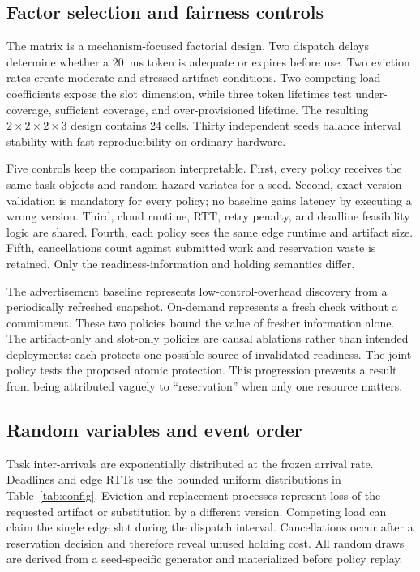 \documentclass[conference]{IEEEtran}
\begin{document}
\subsection{Factor selection and fairness controls}

The matrix is a mechanism-focused factorial design. Two dispatch delays determine
whether a 20~ms token is adequate or expires before use. Two eviction rates create
moderate and stressed artifact conditions. Two competing-load coefficients expose
the slot dimension, while three token lifetimes test under-coverage, sufficient
coverage, and over-provisioned lifetime. The resulting $2\times2\times2\times3$
design contains 24 cells. Thirty independent seeds balance interval stability with
fast reproducibility on ordinary hardware.

Five controls keep the comparison interpretable. First, every policy receives the
same task objects and random hazard variates for a seed. Second, exact-version
validation is mandatory for every policy; no baseline gains latency by executing a
wrong version. Third, cloud runtime, RTT, retry penalty, and deadline feasibility
logic are shared. Fourth, each policy sees the same edge runtime and artifact size.
Fifth, cancellations count against submitted work and reservation waste is retained.
Only the readiness-information and holding semantics differ.

The advertisement baseline represents low-control-overhead discovery from a
periodically refreshed snapshot. On-demand represents a fresh check without a
commitment. These two policies bound the value of fresher information alone. The
artifact-only and slot-only policies are causal ablations rather than intended
deployments: each protects one possible source of invalidated readiness. The joint
policy tests the proposed atomic protection. This progression prevents a result
from being attributed vaguely to ``reservation'' when only one resource matters.

\subsection{Random variables and event order}

Task inter-arrivals are exponentially distributed at the frozen arrival rate.
Deadlines and edge RTTs use the bounded uniform distributions in
Table~\ref{tab:config}. Eviction and replacement processes represent loss of the
requested artifact or substitution by a different version. Competing load can
claim the single edge slot during the dispatch interval. Cancellations occur after
a reservation decision and therefore reveal unused holding cost. All random draws
are derived from a seed-specific generator and materialized before policy replay.
\end{document}
